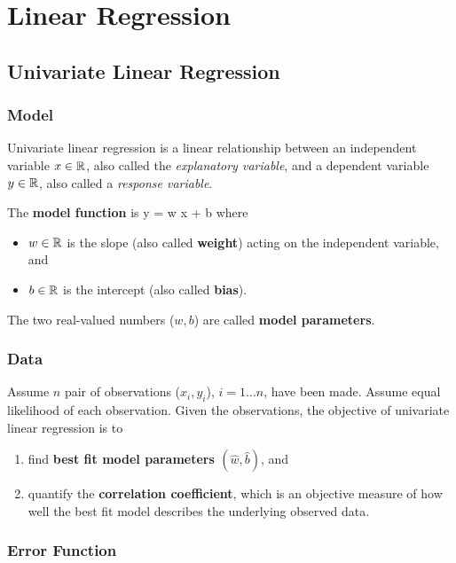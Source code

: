 \section{Linear Regression}

\subsection{Univariate Linear Regression}

\subsubsection{Model}

Univariate linear regression is a linear relationship 
between an independent variable $x \in \mathbb{R}$, 
also called the 
{\em explanatory variable}, and a dependent variable
$y \in \mathbb{R}$, also called a {\em response variable}.

The {\bf model function} is
\be
y = w x + b
\label{eq:lin_reg_model}
\ee
where
\begin{itemize}
\item $w \in \mathbb{R}$ is the slope (also called {\bf weight}) 
acting on the independent variable, and
\item $b \in \mathbb{R}$ is the intercept (also called {\bf bias}).
\end{itemize}
The two real-valued numbers ($w, b$) are called
{\bf model parameters}.

\subsubsection{Data}

Assume $n$ pair of observations ($x_i, y_i$), $i=1\ldots n$, 
have been made.  
Assume equal likelihood of each observation.
Given the observations, the objective
of univariate linear regression is to 
\begin{enumerate}
\item find {\bf best fit model parameters 
$(\hat{w}, \hat{b})$}, and
\item quantify the {\bf correlation coefficient}, 
which is an objective measure of 
how well the best fit model describes the underlying 
observed data.  
\end{enumerate}

\subsubsection{Error Function}
 
